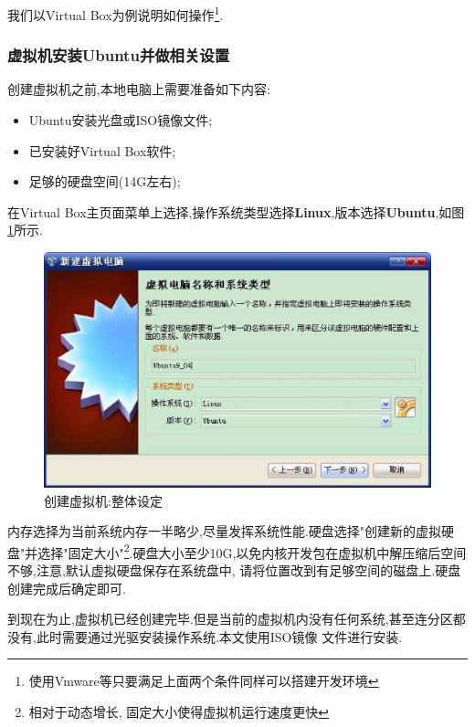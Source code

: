 \documentclass[12pt,a4paper,titlepage]{article}
\begin{document}
我们以Virtual Box为例说明如何操作\footnote{使用Vmware等只要满足上面两个条件同样可以搭建开发环境}.
\subsubsection{虚拟机安装Ubuntu并做相关设置}
创建虚拟机之前,本地电脑上需要准备如下内容:
\begin{itemize}
\item Ubuntu安装光盘或ISO镜像文件;
\item 已安装好Virtual Box软件;
\item 足够的硬盘空间(14G左右);
\end{itemize}

在Virtual Box主页面菜单上选择,操作系统类型选择\textbf{Linux},版本选择\textbf{Ubuntu},如图\ref{f_create_vb1}所示.
\begin{figure}[!bthp]
\centering\includegraphics[width=1\textwidth]{pic/f_create_vb1.eps}
\caption{创建虚拟机:整体设定\label{f_create_vb1}}
\end{figure}
内存选择为当前系统内存一半略少,尽量发挥系统性能.硬盘选择"创建新的虚拟硬盘"并选择"固定大小"\footnote{相对于动态增长,
固定大小使得虚拟机运行速度更快}.硬盘大小至少10G,以免内核开发包在虚拟机中解压缩后空间不够,{注意,默认虚拟硬盘保存在系统盘中,
请将位置改到有足够空间的磁盘上}.硬盘创建完成后确定即可.

到现在为止,虚拟机已经创建完毕.但是当前的虚拟机内没有任何系统,甚至连分区都没有,此时需要通过光驱安装操作系统.本文使用ISO镜像
文件进行安装.
\end{document}

